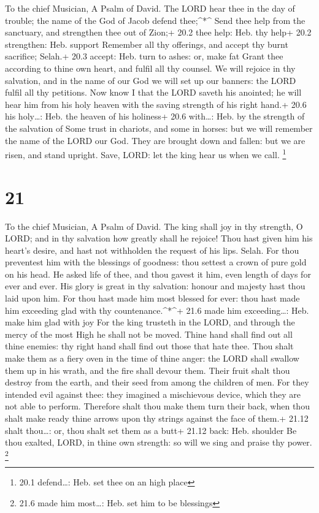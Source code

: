 To the chief Musician, A Psalm of David.  The LORD hear thee
in the day of trouble; the name of the God of Jacob defend
thee;\^{}*\^{}  Send thee help from the sanctuary, and
strengthen thee out of Zion;+ 20.2 thee help: Heb. thy help+ 20.2
strengthen: Heb. support  Remember all thy offerings, and
accept thy burnt sacrifice; Selah.+ 20.3 accept: Heb. turn to ashes: or,
make fat  Grant thee according to thine own heart, and
fulfil all thy counsel.  We will rejoice in thy salvation,
and in the name of our God we will set up our banners: the LORD fulfil
all thy petitions.  Now know I that the LORD saveth his
anointed; he will hear him from his holy heaven with the saving strength
of his right hand.+ 20.6 his holy\ldots: Heb. the heaven of his
holiness+ 20.6 with\ldots: Heb. by the strength of the salvation of
 Some trust in chariots, and some in horses: but we will
remember the name of the LORD our God.  They are brought
down and fallen: but we are risen, and stand upright.  Save,
LORD: let the king hear us when we call. \footnote{20.1 defend\ldots:
  Heb. set thee on an high place}

\hypertarget{section-20}{%
\section{21}\label{section-20}}

To the chief Musician, A Psalm of David.  The king shall joy
in thy strength, O LORD; and in thy salvation how greatly shall he
rejoice!  Thou hast given him his heart's desire, and hast
not withholden the request of his lips. Selah.  For thou
preventest him with the blessings of goodness: thou settest a crown of
pure gold on his head.  He asked life of thee, and thou
gavest it him, even length of days for ever and ever.  His
glory is great in thy salvation: honour and majesty hast thou laid upon
him.  For thou hast made him most blessed for ever: thou
hast made him exceeding glad with thy countenance.\^{}*\^{}+ 21.6 made
him exceeding\ldots: Heb. make him glad with joy  For the
king trusteth in the LORD, and through the mercy of the most High he
shall not be moved.  Thine hand shall find out all thine
enemies: thy right hand shall find out those that hate thee.
 Thou shalt make them as a fiery oven in the time of thine
anger: the LORD shall swallow them up in his wrath, and the fire shall
devour them.  Their fruit shalt thou destroy from the
earth, and their seed from among the children of men.  For
they intended evil against thee: they imagined a mischievous device,
which they are not able to perform.  Therefore shalt thou
make them turn their back, when thou shalt make ready thine arrows upon
thy strings against the face of them.+ 21.12 shalt thou\ldots: or, thou
shalt set them as a butt+ 21.12 back: Heb. shoulder  Be
thou exalted, LORD, in thine own strength: so will we sing and praise
thy power. \footnote{21.6 made him most\ldots: Heb. set him to be
  blessings}

